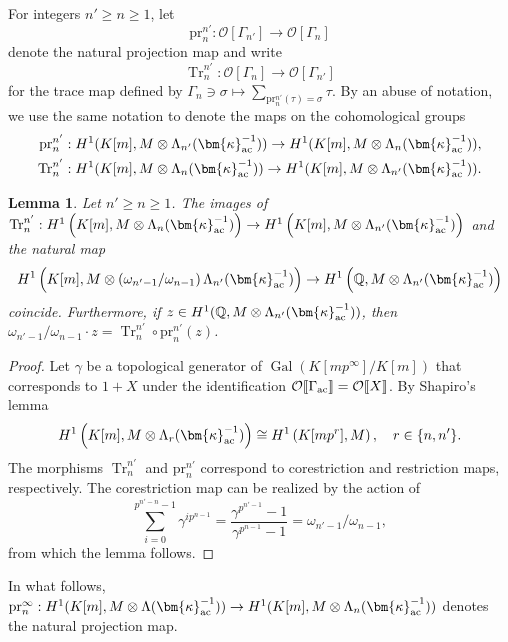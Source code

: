 \documentclass{amsart}
\numberwithin{equation}{section}
\newtheorem{lemma}[theorem]{Lemma}
\newcommand{\pr}{\mathrm{pr}}
\newcommand{\Tr}{\operatorname{Tr}}
\newcommand{\Gal}{\operatorname{Gal}}
\newcommand{\QQ}{\mathbb{Q}}
\newcommand{\cO}{\mathcal{O}}
\newcommand{\ac}{\textup{ac}}
\newcommand{\bk}{(\bm{\kappa}_{\ac}^{-1})}
\begin{document}
For integers $n'\ge n\ge1$, let
\[
\pr^{n'}_{n}:\cO[\Gamma_{n'}]\to\cO[\Gamma_{n}]
\]
denote the natural projection map and write
\[
\Tr^{n'}_{n}:\cO[\Gamma_{n}]\to\cO[\Gamma_{n'}]
\]
for the trace map defined by $\Gamma_{n}\ni\sigma\mapsto \displaystyle\sum_{\pr^{n'}_n(\tau)=\sigma}\tau$.  By an abuse of notation, we use the same notation to denote the maps on the cohomological groups
\begin{align*}
\pr^{n'}_n&:H^1(K[m],M\otimes\Lambda_{n'}\bk)\to H^1(K[m],M\otimes\Lambda_{n}\bk),\\
\Tr_{n}^{n'}&:H^1(K[m],M\otimes\Lambda_{n}\bk)\to H^1(K[m],M\otimes\Lambda_{n'}\bk).
\end{align*}



\begin{lemma}\label{lem:image-trace}
    Let $n'\ge n\ge1$. The images of $\Tr_n^{n'}:H^1\left(K[m],M\otimes\Lambda_n\bk\right)\to H^1\left(K[m],M\otimes\Lambda_{n'}\bk\right)$ and the natural map $$H^1\left(K[m],M\otimes\left(\omega_{n'-1}/\omega_{n-1}\right)\Lambda_{n'}\bk\right)\to H^1\left(\QQ,M\otimes\Lambda_{n'}\bk\right)$$ coincide. Furthermore, if $z\in H^1(\QQ,M\otimes\Lambda_{n'}\bk)$, then $\omega_{n'-1}/\omega_{n-1}\cdot z=\Tr_{n}^{n'}\circ\pr^{n'}_n(z)$.
\end{lemma}
\begin{proof}
Let $\gamma$ be a topological generator of $\Gal(K[mp^\infty]/K[m])$ that corresponds to $1+X$ under the identification $\cO\llbracket\Gamma_\ac\rrbracket=\cO\llbracket X\rrbracket$. 
By Shapiro's lemma
\[
H^1\left(K[m],M\otimes\Lambda_r\bk\right)\cong H^1\left(K[mp^r],M\right), \quad r\in\{n,n'\}.
\]
The morphisms $\Tr_n^{n'}$ and $\pr_n^{n'}$ correspond to corestriction and restriction maps, respectively. The corestriction map can be realized by the action of $$\sum_{i=0}^{p^{n'-n}-1}\gamma^{ip^{n-1}}=\frac{\gamma^{p^{n'-1}}-1}{\gamma^{p^{n-1}}-1}=\omega_{n'-1}/\omega_{n-1},$$ 
 from which the lemma follows.    \end{proof}

In what follows, $\pr^\infty_n:H^1(K[m],M\otimes\Lambda\bk)\to H^1(K[m],M\otimes\Lambda_n\bk)$ denotes the natural projection map.
\end{document}

